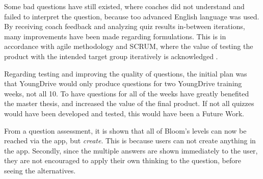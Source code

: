   Some bad questions have still existed, where coaches did not understand and failed to interpret the question, because too advanced English language was used. By receiving coach feedback and analyzing quiz results in-between iterations, many improvements have been made regarding formulations. This is in accordance with agile methodology and SCRUM, where the value of testing the product with the intended target group iteratively is acknowledged \citep{kniberg}.




  Regarding testing and improving the quality of questions, the initial plan was that YoungDrive would only produce questions for two YoungDrive training weeks, not all 10. To have questions for all of the weeks have greatly benefited the master thesis, and increased the value of the final product. If not all quizzes would have been developed and tested, this would have been a Future Work.

  From a question assessment, it is shown that all of Bloom's levels can now be reached via the app, but \textit{create}. This is because users can not create anything in the app. Secondly, since the multiple answers are shown immediately to the user, they are not encouraged to apply their own thinking to the question, before seeing the alternatives.


